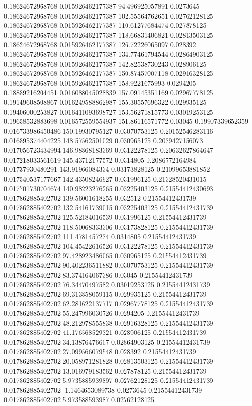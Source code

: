 0.18624672968768 0.015926462177387 94.496925057891 0.0273645
0.18624672968768 0.015926462177387 102.55564762651 0.02762128125
0.18624672968768 0.015926462177387 110.61277684474 0.027878125
0.18624672968768 0.015926462177387 118.66831406821 0.02813503125
0.18624672968768 0.015926462177387 126.72226065097 0.028392
0.18624672968768 0.015926462177387 134.77461794544 0.02864903125
0.18624672968768 0.015926462177387 142.82538730243 0.028906125
0.18624672968768 0.015926462177387 150.87457007118 0.02916328125
0.18624672968768 0.015926462177387 158.9221675993 0.0294205
0.18889216204451 0.016088045028839 157.09145351169 0.02967778125
0.19149608508867 0.016249588862987 155.30557696322 0.029935125
0.19406000253827 0.016411093698727 153.56271815773 0.03019253125
0.19658532883698 0.016572559554937 151.86116571772 0.03045
0.19907339652359 0.016733986450486 150.19930795127 0.03070753125
0.20152546283116 0.016895374404225 148.57562501029 0.030965125
0.2039427156073 0.017056723434994 146.98868183369 0.03122278125
0.20632627864647 0.017218033561619 145.43712177572 0.0314805
0.2086772164984 0.01737930480291 143.91966084334 0.03173828125
0.21099653881852 0.017540537177667 142.43508246927 0.031996125
0.21328520431015 0.017701730704674 140.98223276265 0.03225403125
0.21554412430693 0.017862885402702 139.56001618255 0.032512
0.21554412431739 0.017862885402702 132.54161739015 0.03225403125
0.21554412431739 0.017862885402702 125.52184016539 0.031996125
0.21554412431739 0.017862885402702 118.50068333306 0.03173828125
0.21554412431739 0.017862885402702 111.4781457234 0.0314805
0.21554412431739 0.017862885402702 104.45422616526 0.03122278125
0.21554412431739 0.017862885402702 97.428923486065 0.030965125
0.21554412431739 0.017862885402702 90.402236511882 0.03070753125
0.21554412431739 0.017862885402702 83.374164067386 0.03045
0.21554412431739 0.017862885402702 76.34470497582 0.03019253125
0.21554412431739 0.017862885402702 69.313858059115 0.029935125
0.21554412431739 0.017862885402702 62.281622137717 0.02967778125
0.21554412431739 0.017862885402702 55.247996030726 0.0294205
0.21554412431739 0.017862885402702 48.212978555838 0.02916328125
0.21554412431739 0.017862885402702 41.176568529321 0.028906125
0.21554412431739 0.017862885402702 34.13876476607 0.02864903125
0.21554412431739 0.017862885402702 27.099566079548 0.028392
0.21554412431739 0.017862885402702 20.058971281828 0.02813503125
0.21554412431739 0.017862885402702 13.016979183562 0.027878125
0.21554412431739 0.017862885402702 5.9735885939897 0.02762128125
0.21554412431739 0.017862885402702 -1.1464653089738 0.0273645
0.21554412431739 0.017862885402702 5.973588593987 0.02762128125
